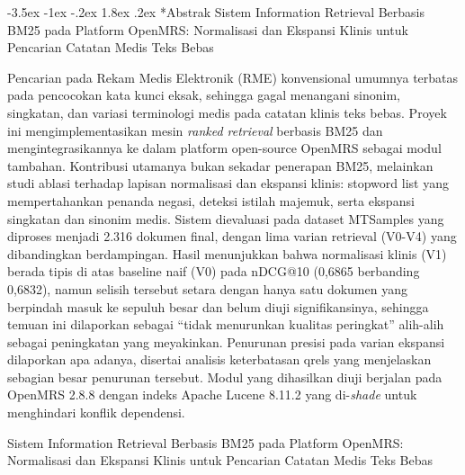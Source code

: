 \documentclass[a4paper,12pt]{article}
\makeatletter
\renewcommand{\section}{\@startsection{section}{1}{\z@}%
  {-3.5ex \@plus -1ex \@minus -.2ex}%
  {1.8ex \@plus .2ex}%
  {\normalfont\normalsize\bfseries}}
\makeatother
\begin{document}
\setcounter{page}{1}
\begin{center}
  \section*{Abstrak}
  \vspace{-0.3cm}
  Sistem Information Retrieval Berbasis BM25 pada Platform OpenMRS: Normalisasi dan Ekspansi Klinis untuk Pencarian Catatan Medis Teks Bebas
\end{center}
\vspace{0.4cm}
\noindent Pencarian pada Rekam Medis Elektronik (RME) konvensional umumnya terbatas pada pencocokan kata kunci eksak, sehingga gagal menangani sinonim, singkatan, dan variasi terminologi medis pada catatan klinis teks bebas. Proyek ini mengimplementasikan mesin \textit{ranked retrieval} berbasis BM25 dan mengintegrasikannya ke dalam platform open-source OpenMRS sebagai modul tambahan. Kontribusi utamanya bukan sekadar penerapan BM25, melainkan studi ablasi terhadap lapisan normalisasi dan ekspansi klinis: stopword list yang mempertahankan penanda negasi, deteksi istilah majemuk, serta ekspansi singkatan dan sinonim medis. Sistem dievaluasi pada dataset MTSamples yang diproses menjadi 2.316 dokumen final, dengan lima varian retrieval (V0-V4) yang dibandingkan berdampingan. Hasil menunjukkan bahwa normalisasi klinis (V1) berada tipis di atas baseline naif (V0) pada nDCG@10 (0,6865 berbanding 0,6832), namun selisih tersebut setara dengan hanya satu dokumen yang berpindah masuk ke sepuluh besar dan belum diuji signifikansinya, sehingga temuan ini dilaporkan sebagai ``tidak menurunkan kualitas peringkat'' alih-alih sebagai peningkatan yang meyakinkan. Penurunan presisi pada varian ekspansi dilaporkan apa adanya, disertai analisis keterbatasan qrels yang menjelaskan sebagian besar penurunan tersebut. Modul yang dihasilkan diuji berjalan pada OpenMRS 2.8.8 dengan indeks Apache Lucene 8.11.2 yang di-\textit{shade} untuk menghindari konflik dependensi.

\clearpage

\begin{center}
  Sistem Information Retrieval Berbasis BM25 pada Platform OpenMRS: Normalisasi dan Ekspansi Klinis untuk Pencarian Catatan Medis Teks Bebas
\end{center}
\vspace{0.4cm}
\end{document}
